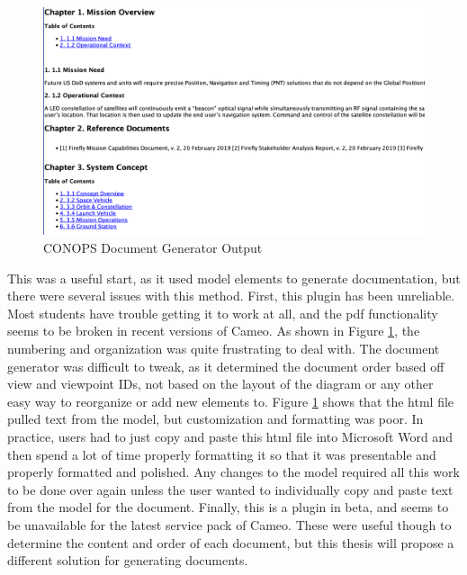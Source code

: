 \begin{figure}
    \centering
    \includegraphics[width=\textwidth]{Thesis/Literature_Review/Lit Review Figures/old method of doc generator 2.png}
    \caption{CONOPS Document Generator Output}
    \label{fig:CONOPS Document Generator Output 2}
\end{figure}

This was a useful start, as it used model elements to generate documentation, but there were several issues with this method. First, this plugin has been unreliable. Most students have trouble getting it to work at all, and the pdf functionality seems to be broken in recent versions of Cameo. As shown in Figure \ref{fig:CONOPS Document Generator Output 2}, the numbering and organization was quite frustrating to deal with. The document generator was difficult to tweak, as it determined the document order based off view and viewpoint IDs, not based on the layout of the diagram or any other easy way to reorganize or add new elements to. Figure \ref{fig:CONOPS Document Generator Output 2} shows that the html file pulled text from the model, but customization and formatting was poor. In practice, users had to just copy and paste this html file into Microsoft Word and then spend a lot of time properly formatting it so that it was presentable and properly formatted and polished. Any changes to the model required all this work to be done over again unless the user wanted to individually copy and paste text from the model for the document. Finally, this is a plugin in beta, and seems to be unavailable for the latest service pack of Cameo. These were useful though to determine the content and order of each document, but this thesis will propose a different solution for generating documents. 